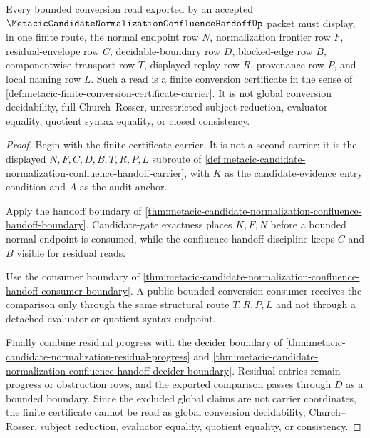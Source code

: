 \begin{theorem}
\label{thm:metacic-finite-conversion-certificate-boundary}
Every bounded conversion read exported by an accepted $\MetacicCandidateNormalizationConfluenceHandoffUp$ packet must display, in one finite route, the normal endpoint row $N$, normalization frontier row $F$, residual-envelope row $C$, decidable-boundary row $D$, blocked-edge row $B$, componentwise transport row $T$, displayed replay row $R$, provenance row $P$, and local naming row $L$. Such a read is a finite conversion certificate in the sense of \autoref{def:metacic-finite-conversion-certificate-carrier}. It is not global conversion decidability, full Church--Rosser, unrestricted subject reduction, evaluator equality, quotient syntax equality, or closed consistency.
\end{theorem}
\begin{proof}
Begin with the finite certificate carrier. It is not a second carrier: it is the displayed $N,F,C,D,B,T,R,P,L$ subroute of \autoref{def:metacic-candidate-normalization-confluence-handoff-carrier}, with $K$ as the candidate-evidence entry condition and $A$ as the audit anchor.

Apply the handoff boundary of \autoref{thm:metacic-candidate-normalization-confluence-handoff-boundary}. Candidate-gate exactness places $K,F,N$ before a bounded normal endpoint is consumed, while the confluence handoff discipline keeps $C$ and $B$ visible for residual reads.

Use the consumer boundary of \autoref{thm:metacic-candidate-normalization-confluence-handoff-consumer-boundary}. A public bounded conversion consumer receives the comparison only through the same structural route $T,R,P,L$ and not through a detached evaluator or quotient-syntax endpoint.

Finally combine residual progress with the decider boundary of \autoref{thm:metacic-candidate-normalization-residual-progress} and \autoref{thm:metacic-candidate-normalization-confluence-handoff-decider-boundary}. Residual entries remain progress or obstruction rows, and the exported comparison passes through $D$ as a bounded boundary. Since the excluded global claims are not carrier coordinates, the finite certificate cannot be read as global conversion decidability, Church--Rosser, subject reduction, evaluator equality, quotient equality, or consistency.
\end{proof}

